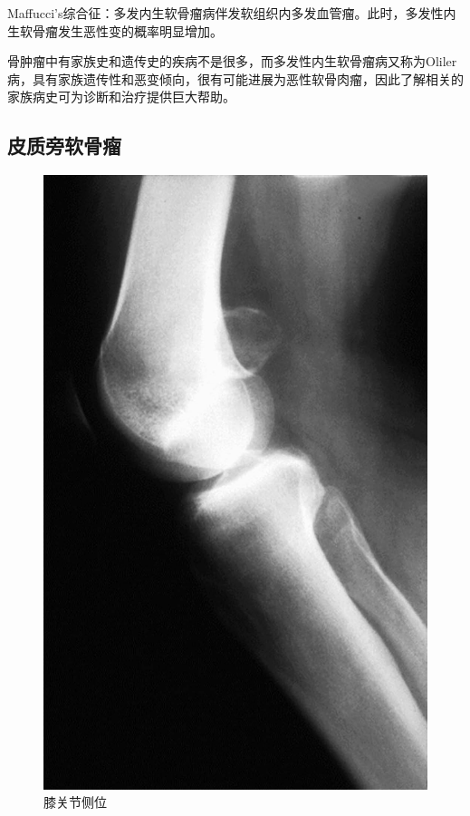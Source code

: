 Maffucci's综合征：多发内生软骨瘤病伴发软组织内多发血管瘤。此时，多发性内生软骨瘤发生恶性变的概率明显增加。

骨肿瘤中有家族史和遗传史的疾病不是很多，而多发性内生软骨瘤病又称为Oliler病，具有家族遗传性和恶变倾向，很有可能进展为恶性软骨肉瘤，因此了解相关的家族病史可为诊断和治疗提供巨大帮助。

\subsection{皮质旁软骨瘤}

\begin{figure}[!htbp]
 \centering
 \includegraphics{./images/Image00091.jpg}
 \captionsetup{justification=centering}
 \caption{膝关节侧位}
 \label{fig2-7-6}
  \end{figure} 

